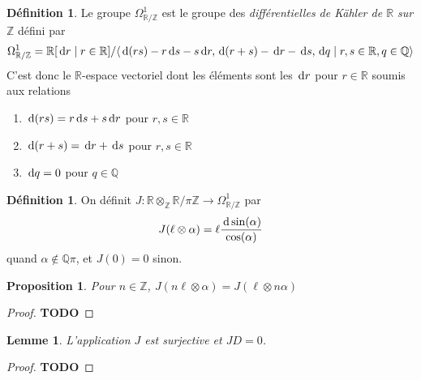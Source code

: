 \documentclass{article}
\newcommand{\Z}{\mathbb{Z}}
\newcommand{\Q}{\mathbb{Q}}
\newcommand{\R}{\mathbb{R}}
\renewcommand{\d}{{\rm \, d}}
\newcommand{\todo}{\textbf{TODO}}
\theoremstyle{plain}
\newtheorem{proposition}[theorem]{Proposition}
\newtheorem{lemma}[theorem]{Lemme}
\theoremstyle{definition}
\newtheorem{definition}[theorem]{Définition}
\theoremstyle{remark}
\begin{document}
\begin{definition}
    Le groupe $\Omega_{\R/\Z}^1$ est le groupe des \emph{différentielles de Kähler de $\R$ sur $\Z$} défini par
    \[\Omega_{\R/\Z}^1 = \R[\d r\mid r \in \R]/\langle \d(rs) - r\d s - s\d r, \d (r+s) - \d r - \d s, \d q \mid r,s \in \R, q \in \Q\rangle\]
    C'est donc le $\R$-espace vectoriel dont les éléments sont les $\d r$ pour $r \in \R$ soumis aux relations
    \begin{enumerate}
        \item $\d (rs) = r \d s + s \d r$ pour $r,s \in \R$
        \item $\d (r + s) = \d r + \d s$ pour $r,s \in \R$
        \item $\d q = 0$ pour $q \in \Q$
    \end{enumerate}
\end{definition}

\begin{definition}
    On définit $J : \R\otimes_\Z \R/\pi\Z \to \Omega_{\R/\Z}^1$ par
    \[J(\ell \otimes \alpha) = \ell \frac{\d \sin(\alpha)}{\cos(\alpha)}\] quand $\alpha \notin \Q\pi$, et $J(0) = 0$ sinon.
\end{definition}

\begin{proposition}
    Pour $n \in \Z$, $J(n \ell \otimes \alpha) = J(\ell \otimes n\alpha)$
\end{proposition}

\begin{proof}
    \todo
\end{proof}

\begin{lemma}
    L'application $J$ est surjective et $JD = 0$.
\end{lemma}

\begin{proof}
    \todo
\end{proof}
\end{document}
